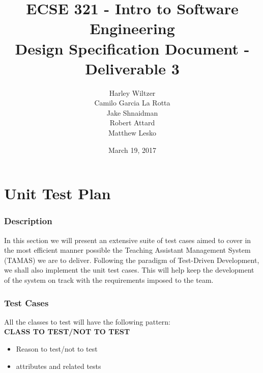 \documentclass[12pt]{report}
\title{ECSE 321 - Intro to Software Engineering\\Design Specification Document - Deliverable 3}
\author{Harley Wiltzer\\Camilo Garcia La Rotta\\Jake Shnaidman\\Robert Attard\\Matthew Lesko}
\date{March 19, 2017}
\begin{document}
\maketitle
\newpage
{} %
\tableofcontents
\part{Unit Test Plan}
\section{Description}
	In this section we will present an extensive suite of test cases aimed to cover in the most
	efficient manner possible the Teaching Assistant Management System (TAMAS) we are to deliver. Following the
	paradigm of Test-Driven Development, we shall also implement the unit test cases. This will help
	keep the development of the system on track with the requirements imposed to the team. 
	
\section{Test Cases}
    All the classes to test will have the following pattern:\\
    
    \textbf{CLASS TO TEST/NOT TO TEST}
    \begin{itemize}
        \item Reason to test/not to test
        \item attributes and related tests
    \end{itemize}
    
\end{document}
